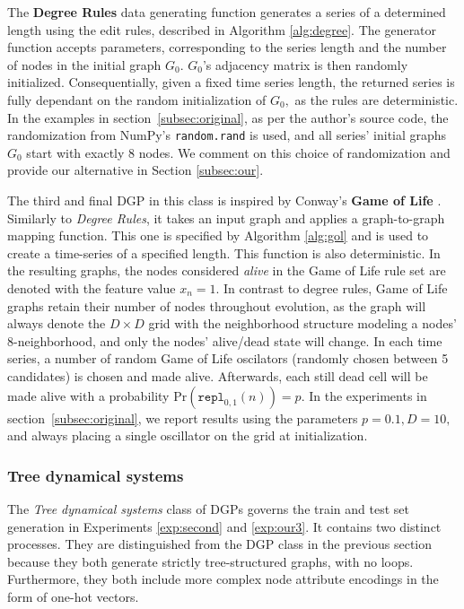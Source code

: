 The \textbf{Degree Rules} data generating function generates a series of a determined length using the edit rules, described in Algorithm \ref{alg:degree}. The generator function accepts parameters, corresponding to the series length and the number of nodes in the initial graph $G_{0}.$ $G_{0}$'s adjacency matrix is then randomly initialized. Consequentially, given a fixed time series length, the returned series is fully dependant on the random initialization of $G_{0},$ as the rules are deterministic. In the examples in section~\ref{subsec:original}, as per the author's source code, the randomization from NumPy's \texttt{random.rand} is used, and all series' initial graphs $G_{0}$ start with exactly 8 nodes. We comment on this choice of randomization and provide our alternative in Section \ref{subsec:our}.

The third and final DGP in this class is inspired by Conway's \textbf{Game of Life} \cite{GoL}. Similarly to \textit{Degree Rules}, it takes an input graph and applies a graph-to-graph mapping function. This one is specified by Algorithm \ref{alg:gol} and is used to create a time-series of a specified length. This function is also deterministic.
In the resulting graphs, the nodes considered \textit{alive} in the Game of Life rule set are denoted with the feature value $x_{n}=1.$ In contrast to degree rules, Game of Life graphs retain their number of nodes throughout evolution, as the graph will always denote the $D \times D$ grid with the neighborhood structure modeling a nodes' 8-neighborhood, and only the nodes' alive/dead state will change. In each time series, a number of random Game of Life oscilators (randomly chosen between 5 candidates) is chosen and made alive. Afterwards, each still dead cell will be made alive with a probability $\text{Pr}(\texttt{repl}_{0,1}(n)) = p$. In the experiments in section~\ref{subsec:original}, we report results using the parameters $p = 0.1, D=10,$ and always placing a single oscillator on the grid at initialization.

\subsubsection{Tree dynamical systems}
\label{subsec:trees}
The \textit{Tree dynamical systems} class of DGPs governs the train and test set generation in Experiments \ref{exp:second} and \ref{exp:our3}. It contains two distinct processes. They are distinguished from the DGP class in the previous section because they both generate strictly tree-structured graphs, with no loops. Furthermore, they both include more complex node attribute encodings in the form of one-hot vectors.

